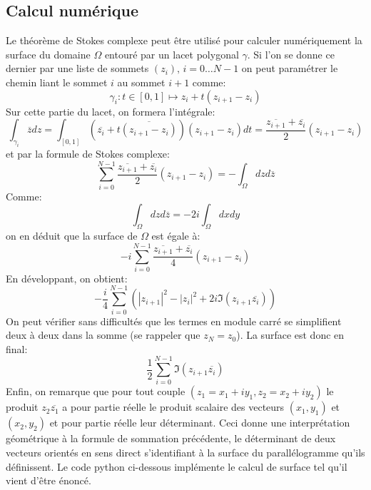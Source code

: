 \subsection{Calcul numérique}
Le théorème de Stokes complexe peut être utilisé pour calculer 
numériquement la surface du domaine $\Omega$ entouré par un lacet polygonal $\gamma$. Si 
l'on se donne ce dernier par une liste de sommets $(z_i), \, i=0 \dots N-1$ on peut paramétrer le chemin liant le sommet $i$ au sommet $i+1$ comme:
\[
\gamma_i \colon t \in [0,1] \mapsto z_i + t\left(z_{i+1}-z_i\right)
\]
Sur cette partie du lacet, on formera l'intégrale:
\[
\int_{\gamma_i}\overline{z}dz = \int_{[0,1]}\left(\overline{ z_i}+t \overline{\left(z_{i+1}-z_i\right)}\right)\left(z_{i+1}-z_i\right) dt=
\frac{\overline{z_{i+1}}+\overline{z_i}}{2}\left(z_{i+1}-z_i\right)
\]
et par la formule de Stokes complexe:
\[
\sum_{i=0}^{N-1}\frac{\overline{z_{i+1}}+\overline{z_i}}{2}\left(z_{i+1}-z_i\right) = - \int_{\Omega} dz d\overline{z}
\]
Comme:
\[
\int_{\Omega} dz d\overline{z} = - 2 i \int_{\Omega} dx dy
\]
on en déduit que la surface de $\Omega$ est égale à:
\[
- i \sum_{i=0}^{N-1}\frac{\overline{z_{i+1}}+\overline{z_i}}{4}\left(z_{i+1}-z_i\right)
\]
En développant, on obtient:
\[
- \frac{i}{4} \sum_{i=0}^{N-1} \left(\left|z_{i+1}\right|^2 - \left|z_i \right|^2 + 2 i \Im \left(z_{i+1}\overline{z_i} \right)
\right)
\]
On peut vérifier sans difficultés que les termes en module carré se simplifient deux à deux dans la somme (se rappeler que $z_N = z_0$). La surface est donc en final:
\[
\frac{1}{2} \sum_{i=0}^{N-1} \Im \left(z_{i+1}\overline{z_i} \right)
\]
Enfin, on remarque que pour tout couple $(z_1=x_1+iy_1, z_2=x_2+iy_2)$ le produit $z_2 \overline{z_1}$ a pour partie réelle le produit scalaire des vecteurs $(x_1,y_1)$ et $(x_2,y_2)$ et pour partie réelle leur déterminant. Ceci donne une interprétation géométrique à la formule de sommation précédente, le déterminant de deux vecteurs orientés en sens direct s'identifiant à la surface du parallélogramme qu'ils définissent. Le code python ci-dessous implémente le calcul de surface tel qu'il vient d'être énoncé. 
